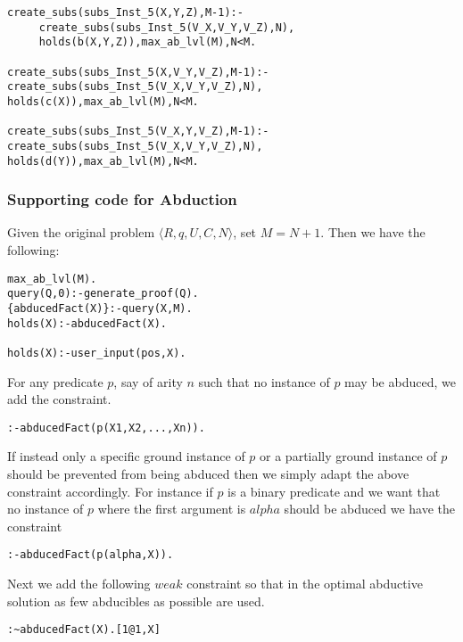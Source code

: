 \begin{lstlisting}[frame=none]
create_subs(subs_Inst_5(X,Y,Z),M-1):-
     create_subs(subs_Inst_5(V_X,V_Y,V_Z),N), 
     holds(b(X,Y,Z)),max_ab_lvl(M),N<M.

create_subs(subs_Inst_5(X,V_Y,V_Z),M-1):-
create_subs(subs_Inst_5(V_X,V_Y,V_Z),N), holds(c(X)),max_ab_lvl(M),N<M.

create_subs(subs_Inst_5(V_X,Y,V_Z),M-1):-
create_subs(subs_Inst_5(V_X,V_Y,V_Z),N), holds(d(Y)),max_ab_lvl(M),N<M.
\end{lstlisting}

\subsubsection{Supporting code for Abduction} 
Given the original problem $\langle R,q,U,C,N\rangle$, set $M=N+1$. Then we have the following: 
\begin{lstlisting}[frame=none]
max_ab_lvl(M).
query(Q,0):-generate_proof(Q).
{abducedFact(X)}:-query(X,M).
holds(X):-abducedFact(X).

holds(X):-user_input(pos,X).
\end{lstlisting}
For any predicate $p$, say of arity $n$ such that no instance of $p$ may be abduced, we add the constraint.
\begin{lstlisting}[frame=none] 
:-abducedFact(p(X1,X2,...,Xn)).
\end{lstlisting}
If instead only a specific ground instance of $p$ or a partially ground instance of $p$ should be prevented from being abduced then we simply adapt the above constraint accordingly. For instance if $p$ is a binary predicate and we want that no instance of $p$ where the first argument is $alpha$ should be abduced we have the constraint
\begin{lstlisting}[frame=none] 
:-abducedFact(p(alpha,X)).
\end{lstlisting}
Next we add the following $weak$ constraint so that in the optimal abductive
solution as few abducibles as possible are used.
\begin{lstlisting}[frame=none] 
:~abducedFact(X).[1@1,X]
\end{lstlisting}

